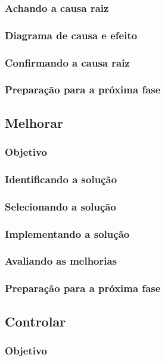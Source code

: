 \documentclass{abnt}
\begin{document}
					\subsubsection {Achando a causa raiz}
					\subsubsection {Diagrama de causa e efeito}
					\subsubsection {Confirmando a causa raiz}
					\subsubsection {Preparação para a próxima fase}
				\subsection {Melhorar}
					\subsubsection {Objetivo}
					\subsubsection {Identificando a solução}
					\subsubsection {Selecionando a solução}
					\subsubsection {Implementando a solução}
					\subsubsection {Avaliando as melhorias}
					\subsubsection {Preparação para a próxima fase}
				\subsection {Controlar}
					\subsubsection {Objetivo}
\end{document}
